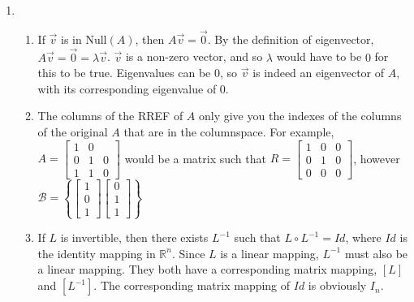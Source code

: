\documentclass[10pt,english]{article}
\begin{document}
\begin{enumerate}
\begin{enumerate}
\end{enumerate}\pagebreak 

\item \begin{enumerate}
    \item If $\vec{v}$ is in Null$(A)$, then $A\vec{v}=\vec{0}$. By the definition of eigenvector, $A\vec{v}=\vec{0}=\lambda\vec{v}$. $\vec{v}$ is a non-zero vector, and so $\lambda$ would have to be $0$ for this to be true. Eigenvalues can be 0, so $\vec{v}$ is indeed an eigenvector of $A$, with its corresponding eigenvalue of 0.
    
    \item The columns of the RREF of $A$ only give you the indexes of the columns of the original $A$ that are in the columnspace. For example, $A=\begin{bmatrix}1&0&\\0&1&0\\1&1&0\end{bmatrix}$ would be a matrix such that $R=\begin{bmatrix}1&0&0\\0&1&0\\0&0&0\end{bmatrix}$, however $\mathcal{B}=\left\{\begin{bmatrix}1\\0\\1\end{bmatrix}\begin{bmatrix}0\\1\\1\end{bmatrix}\right\}$
    
    \item  If $L$ is invertible, then there exists $L^{-1}$ such that $L\circ L^{-1}=Id$, where $Id$ is the identity mapping in $\mathbb{R}^n$. Since $L$ is a linear mapping, $L^{-1}$ must also be a linear mapping. They both have a corresponding matrix mapping, $[L]$ and $[L^{-1}]$. The corresponding matrix mapping of $Id$ is obviously $I_n$. 
    

\end{enumerate}
\end{enumerate}
\end{document}

